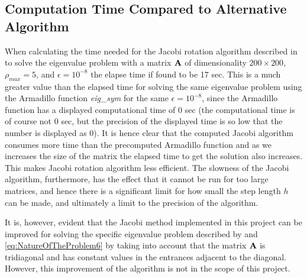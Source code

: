 \subsection{Computation Time Compared to Alternative Algorithm}
\label{subsec:CompTime}
When calculating the time needed for the Jacobi rotation algorithm described in  to solve the eigenvalue problem with a matrix $\mbox{\textbf{A}}$ of dimensionality $200 \times 200$, $\rho_{max} = 5$, and $\epsilon = 10^{-8}$ the elapse time if found to be 17 sec.
This is a much greater value than the elapsed time for solving the same eigenvalue problem using the Armadillo function 
\textit{eig\_sym} 
for the same $\epsilon = 10^{-8}$, since the Armadillo function has a displayed computational time of 0 sec (the computational time is of course not 0 sec, but the precision of the displayed time is so low that the number is displayed as 0). 
It is hence clear that the computed Jacobi algorithm consumes more time than the precomputed Armadillo function and as we increases the size of the matrix the elapsed time to get the solution also increases. 
This makes Jacobi rotation algorithm less efficient.
The slowness of the Jacobi algorithm, furthermore, has the effect that it cannot be run for too large matrices, and hence there is a significant limit for how small the step length $h$ can be made, and ultimately a limit to the precision of the algorithm.  

It is, however, evident that the Jacobi method implemented in this project can be improved for solving the specific eigenvalue problem described by  and \eqref{eq:NatureOfTheProblem6} by taking into account that the matrix $\mbox{\textbf{A}}$ is tridiagonal and has constant values in the entrances adjacent to the diagonal.
However, this improvement of the algorithm is not in the scope of this project.